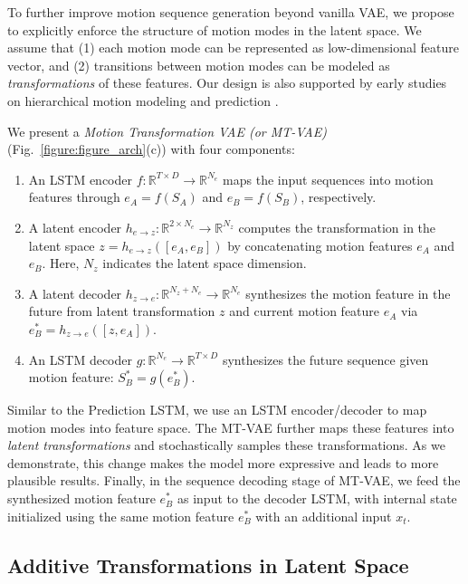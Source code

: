\documentclass[runningheads]{llncs}
\newcommand{\cutsubsectionup}{\vspace*{-0.1in}}
\newcommand{\cutsubsectiondown}{\vspace*{-0.07in}}
\begin{document}
To further improve motion sequence generation beyond vanilla VAE, we propose to explicitly enforce the structure of motion modes in the latent space.
We assume that (1) each motion mode can be represented as low-dimensional feature vector, and (2) transitions between motion modes can be modeled as \textit{transformations} of these features.
Our design is also supported by early studies on hierarchical motion modeling and prediction \cite{bregler1997learning,smith2013sources,lan2014hierarchical}.

We present a \emph{Motion Transformation VAE (or MT-VAE)} (Fig.~\ref{figure:figure_arch}(c)) with four components:
\begin{enumerate}
\item An LSTM encoder $f: \mathbb{R}^{T\times D} \rightarrow \mathbb{R}^{N_e}$ maps the input sequences into motion features through $e_A = f(S_A)$ and $e_B = f(S_B)$, respectively.
\item A latent encoder $h_{e\rightarrow z}: \mathbb{R}^{2 \times N_e} \rightarrow \mathbb{R}^{N_z}$ computes the transformation in the latent space $z = h_{e\rightarrow z}([e_A, e_B])$ by concatenating motion features $e_A$ and $e_B$.
Here, $N_z$ indicates the latent space dimension.
\item A latent decoder $h_{z\rightarrow e}: \mathbb{R}^{N_z + N_e} \rightarrow \mathbb{R}^{N_e}$ synthesizes the motion feature in the future from latent transformation $z$ and current motion feature $e_A$ via $e^*_B = h_{z\rightarrow e}([z, e_A])$.
\item An LSTM decoder $g: \mathbb{R}^{N_e} \rightarrow \mathbb{R}^{T\times D}$ synthesizes the future sequence given motion feature: $S^*_B = g(e^*_B)$.
\end{enumerate}
Similar to the Prediction LSTM, we use an LSTM encoder/decoder to map motion modes into feature space. The MT-VAE further maps these features into \emph{latent transformations} and stochastically samples these transformations. As we demonstrate, this change makes the model more expressive and leads to more plausible results. Finally, in the sequence decoding stage of MT-VAE, we feed the synthesized motion feature $e^*_B$ as input to the decoder LSTM, with internal state initialized using the same motion feature $e^*_B$ with an additional input $x_t$.


\cutsubsectionup
\subsection{Additive Transformations in Latent Space}
\label{sec:tcvae_learning}
\cutsubsectiondown
\end{document}
